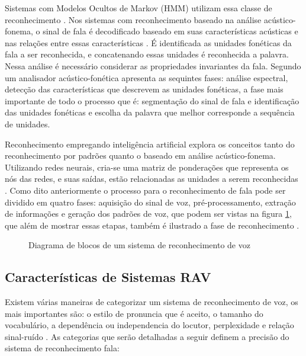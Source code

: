 Sistemas com Modelos Ocultos de Markov (HMM) utilizam essa classe de reconhecimento \cite{AvaliaTecJose}. Nos sistemas com reconhecimento baseado na análise acústico-fonema, o sinal de fala é decodificado baseado em suas características acústicas e nas relações entre essas características \cite{DigSpeechNejat}. É identificada as unidades fonéticas da fala a ser reconhecida, e concatenando essas unidades é reconhecida a palavra. Nessa análise é necessário considerar as propriedades invariantes da fala. Segundo  um analisador acústico-fonética apresenta as sequintes fases: análise espectral, detecção das características que descrevem as unidades fonéticas, a fase mais importante de todo o processo que é: segmentação do sinal de fala e identificação das unidades fonéticas e escolha da palavra que melhor corresponde a sequência de unidades. 

Reconhecimento empregando inteligência artificial explora os conceitos tanto do reconhecimento por padrões quanto o baseado em análise acústico-fonema. Utilizando redes neurais, cria-se uma matriz de ponderações que representa os nós das redes, e suas saídas, estão relacionadas as unidades a serem reconhecidas \cite{AvaliaTecJose}.
Como dito anteriormente o processo para o reconhecimento de fala pode ser dividido em quatro fases: aquisição do sinal de voz, pré-processamento, extração de informações e geração dos padrões de voz, que podem ser vistas na figura \ref{figFala}, que além de mostrar essas etapas, também é ilustrado a fase de reconhecimento \cite{RavIsolAnderson}.

\begin{figure}[H]
\centering

\caption{Diagrama de blocos de um sistema de reconhecimento de voz}
\label{figFala}

\end{figure}


\subsection{Características de Sistemas RAV}\label{sec:red_neu}

Existem várias maneiras de categorizar um sistema de reconhecimento de voz, os mais importantes são: o estilo de pronuncia que é aceito, o tamanho do vocabulário, a dependência ou independencia do locutor, perplexidade e relação sinal-ruído \cite{RavIsolMartins}. As categorias que serão detalhadas a seguir definem a precisão do sistema de reconhecimento fala:

